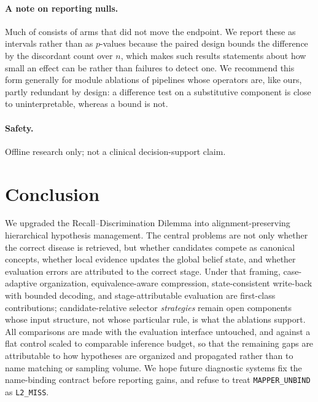 \paragraph{A note on reporting nulls.}
Much of  consists of arms that did not move the endpoint.
We report these as intervals rather than as $p$-values because the paired design bounds the difference by the discordant count over $n$, which makes such results statements about how small an effect can be rather than failures to detect one.
We recommend this form generally for module ablations of pipelines whose operators are, like ours, partly redundant by design: a difference test on a substitutive component is close to uninterpretable, whereas a bound is not.

\paragraph{Safety.}
Offline research only; not a clinical decision-support claim.

\section{Conclusion}
\label{sec:conclusion}

We upgraded the Recall--Discrimination Dilemma into alignment-preserving hierarchical hypothesis management.
The central problems are not only whether the correct disease is retrieved, but whether candidates compete as canonical concepts, whether local evidence updates the global belief state, and whether evaluation errors are attributed to the correct stage.
Under that framing, case-adaptive organization, equivalence-aware compression, state-consistent write-back with bounded decoding, and stage-attributable evaluation are first-class contributions; candidate-relative selector \emph{strategies} remain open components whose input structure, not whose particular rule, is what the ablations support.
All comparisons are made with the evaluation interface untouched, and against a flat control scaled to comparable inference budget, so that the remaining gaps are attributable to how hypotheses are organized and propagated rather than to name matching or sampling volume.
We hope future diagnostic systems fix the name-binding contract before reporting gains, and refuse to treat \texttt{MAPPER\_UNBIND} as \texttt{L2\_MISS}.
